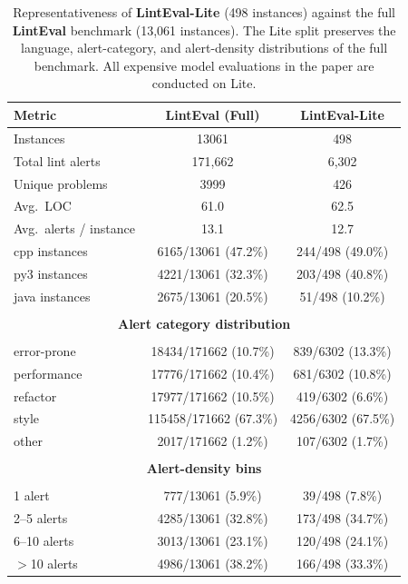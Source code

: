 \begin{table}[t]
\centering
\small
\begin{tabular}{lcc}
\toprule
\textbf{Metric} & \textbf{LintEval (Full)} & \textbf{LintEval-Lite} \\
\midrule
Instances & 13061 & 498 \\
Total lint alerts & 171,662 & 6,302 \\
Unique problems & 3999 & 426 \\
Avg.\ LOC & 61.0 & 62.5 \\
Avg.\ alerts / instance & 13.1 & 12.7 \\
  cpp instances & 6165/13061 (47.2\%) & 244/498 (49.0\%) \\
  py3 instances & 4221/13061 (32.3\%) & 203/498 (40.8\%) \\
  java instances & 2675/13061 (20.5\%) & 51/498 (10.2\%) \\
 &  &  \\
\multicolumn{3}{c}{\textbf{Alert category distribution}}\\ &  &  \\
  error-prone & 18434/171662 (10.7\%) & 839/6302 (13.3\%) \\
  performance & 17776/171662 (10.4\%) & 681/6302 (10.8\%) \\
  refactor & 17977/171662 (10.5\%) & 419/6302 (6.6\%) \\
  style & 115458/171662 (67.3\%) & 4256/6302 (67.5\%) \\
  other & 2017/171662 (1.2\%) & 107/6302 (1.7\%) \\
 &  &  \\
\multicolumn{3}{c}{\textbf{Alert-density bins}}\\ &  &  \\
  1 alert & 777/13061 (5.9\%) & 39/498 (7.8\%) \\
  2--5 alerts & 4285/13061 (32.8\%) & 173/498 (34.7\%) \\
  6--10 alerts & 3013/13061 (23.1\%) & 120/498 (24.1\%) \\
  $>$10 alerts & 4986/13061 (38.2\%) & 166/498 (33.3\%) \\
\bottomrule
\end{tabular}
\caption{Representativeness of \textbf{LintEval-Lite} (498 instances) against the full \textbf{LintEval} benchmark (13,061 instances). The Lite split preserves the language, alert-category, and alert-density distributions of the full benchmark. All expensive model evaluations in the paper are conducted on Lite.}
\label{tab:lite_representativeness}
\end{table}
